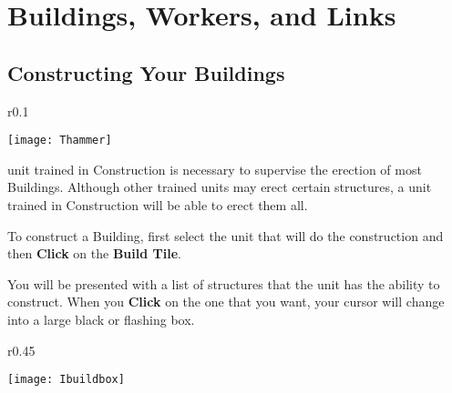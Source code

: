 
\chapter{Buildings, Workers, and Links}

\section{Constructing Your Buildings}


\begin{wrapfigure}{r}{0.1\textwidth}
	\vspace{-20pt}
	\begin{center}
		\texttt{[image: Thammer]}
	\end{center}
	\vspace{-20pt}
\end{wrapfigure}

 unit trained in Construction is necessary to supervise the erection of most Buildings. Although other trained units may erect certain structures, a unit trained in Construction will be able to erect them all.

To construct a Building, first select the unit that will do the construction and then \textbf{Click} on the \textbf{Build Tile}.

You will be presented with a list of structures that the unit has the ability to construct. When you \textbf{Click} on the one that you want, your cursor will change into a large black or flashing box.

\clearpage %

\begin{wrapfigure}{r}{0.45\textwidth}
	\vspace{-20pt}
	\begin{center}
		\texttt{[image: Ibuildbox]} %
	\end{center}
	\vspace{-20pt}
\end{wrapfigure}

